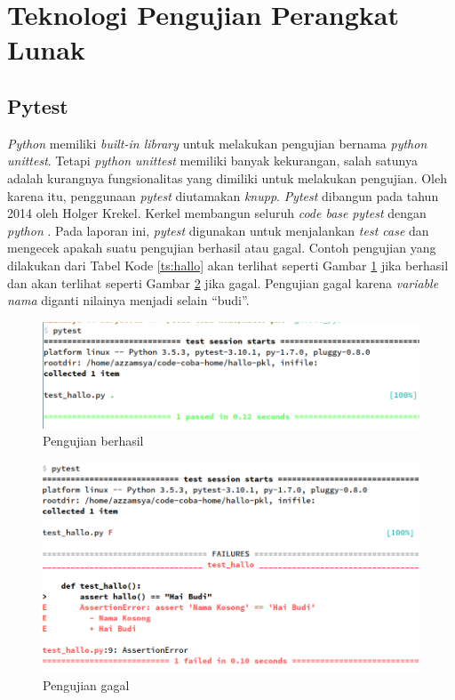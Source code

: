 \section{Teknologi Pengujian Perangkat Lunak}

\subsection{Pytest}

\emph{Python} memiliki \emph{built-in library} untuk melakukan
pengujian bernama \emph{python unittest}. Tetapi \emph{python
  unittest} memiliki banyak kekurangan, salah satunya adalah kurangnya
fungsionalitas yang dimiliki untuk melakukan pengujian. Oleh karena
itu, penggunaan \emph{pytest} diutamakan \emph{knupp}.  \emph{Pytest}
dibangun pada tahun 2014 oleh Holger Krekel. Kerkel membangun seluruh
\emph{code base} \emph{pytest} dengan \emph{python}
\parencite{pytest-ol}. Pada laporan ini, \emph{pytest} digunakan untuk
menjalankan \emph{test case} dan mengecek apakah suatu pengujian
berhasil atau gagal. Contoh pengujian yang dilakukan dari Tabel Kode
\ref{ts:hallo} akan terlihat seperti Gambar
\ref{fig:pytest-berhasil} jika berhasil dan akan terlihat seperti
Gambar \ref{fig:pytest-gagal} jika gagal. Pengujian gagal karena \emph{variable nama}
diganti nilainya menjadi selain ``budi''.

\begin{figure}[H]
  \centering
  \includegraphics[width=.7\linewidth]{img/pytest-berhasil}
  \caption{Pengujian berhasil}
  \label{fig:pytest-berhasil}
\end{figure}

\begin{figure}[H]
  \centering
  \includegraphics[width=.7\linewidth]{img/pytest-gagal}
  \caption{Pengujian gagal}
  \label{fig:pytest-gagal}
\end{figure}


